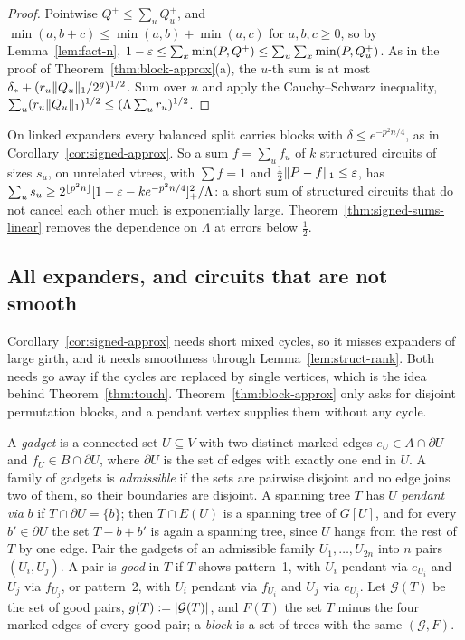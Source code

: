 \begin{proof}
Pointwise $Q^+\le\sum_uQ_u^+$, and $\min(a,b+c)\le\min(a,b)+\min(a,c)$ for $a,b,c\ge0$, so by Lemma~\ref{lem:fact-n}, $1-\varepsilon\le\sum_x\min(P,Q^+)\le\sum_u\sum_x\min(P,Q_u^+)$. As in the proof of Theorem~\ref{thm:block-approx}(a), the $u$-th sum is at most $\delta_*+(r_u\lVert Q_u\rVert_1/2^g)^{1/2}$. Sum over $u$ and apply the Cauchy--Schwarz inequality, $\sum_u(r_u\lVert Q_u\rVert_1)^{1/2}\le(\Lambda\sum_ur_u)^{1/2}$.
\end{proof}

On linked expanders every balanced split carries blocks with $\delta\le e^{-p^2n/4}$, as in Corollary~\ref{cor:signed-approx}. So a sum $f=\sum_uf_u$ of $k$ structured circuits of sizes $s_u$, on unrelated vtrees, with $\sum f=1$ and $\frac12\lVert P-f\rVert_1\le\varepsilon$, has $\sum_us_u\ge2^{\lfloor p^2n\rfloor}[1-\varepsilon-ke^{-p^2n/4}]_+^2/\Lambda$: a short sum of structured circuits that do not cancel each other much is exponentially large. Theorem~\ref{thm:signed-sums-linear} removes the dependence on $\Lambda$ at errors below $\frac12$.

\subsection{All expanders, and circuits that are not smooth}\label{sec:signed-expanders}

Corollary~\ref{cor:signed-approx} needs short mixed cycles, so it misses expanders of large girth, and it needs smoothness through Lemma~\ref{lem:struct-rank}. Both needs go away if the cycles are replaced by single vertices, which is the idea behind Theorem~\ref{thm:touch}. Theorem~\ref{thm:block-approx} only asks for disjoint permutation blocks, and a pendant vertex supplies them without any cycle.

A \emph{gadget} is a connected set $U\subseteq V$ with two distinct marked edges $e_U\in A\cap\partial U$ and $f_U\in B\cap\partial U$, where $\partial U$ is the set of edges with exactly one end in $U$. A family of gadgets is \emph{admissible} if the sets are pairwise disjoint and no edge joins two of them, so their boundaries are disjoint. A spanning tree $T$ has $U$ \emph{pendant via} $b$ if $T\cap\partial U=\{b\}$; then $T\cap E(U)$ is a spanning tree of $G[U]$, and for every $b'\in\partial U$ the set $T-b+b'$ is again a spanning tree, since $U$ hangs from the rest of $T$ by one edge. Pair the gadgets of an admissible family $U_1,\dots,U_{2n}$ into $n$ pairs $(U_i,U_j)$. A pair is \emph{good} in $T$ if $T$ shows pattern~1, with $U_i$ pendant via $e_{U_i}$ and $U_j$ via $f_{U_j}$, or pattern~2, with $U_i$ pendant via $f_{U_i}$ and $U_j$ via $e_{U_j}$. Let $\mathcal G(T)$ be the set of good pairs, $g(T):=\lvert \mathcal G(T)\rvert$, and $F(T)$ the set $T$ minus the four marked edges of every good pair; a \emph{block} is a set of trees with the same $(\mathcal G,F)$.

